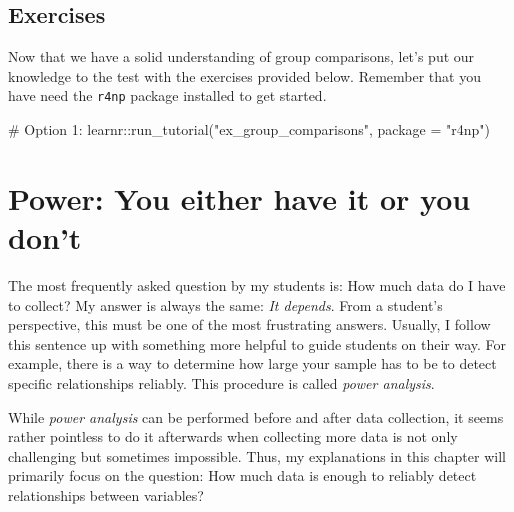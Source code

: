 \documentclass[
  letterpaper,
]{krantz}
\makeatletter
\newenvironment{Shaded}{\begin{snugshade}}{\end{snugshade}}
\newcommand{\AttributeTok}[1]{\textcolor[rgb]{0.40,0.45,0.13}{#1}}
\newcommand{\CommentTok}[1]{\textcolor[rgb]{0.37,0.37,0.37}{#1}}
\newcommand{\FunctionTok}[1]{\textcolor[rgb]{0.28,0.35,0.67}{#1}}
\newcommand{\NormalTok}[1]{\textcolor[rgb]{0.00,0.23,0.31}{#1}}
\newcommand{\SpecialCharTok}[1]{\textcolor[rgb]{0.37,0.37,0.37}{#1}}
\newcommand{\StringTok}[1]{\textcolor[rgb]{0.13,0.47,0.30}{#1}}
\newenvironment{kframe}{%
\medskip{}
\setlength{\fboxsep}{.8em}
 \def\at@end@of@kframe{}%
 \ifinner\ifhmode%
  \def\at@end@of@kframe{\end{minipage}}%
  \begin{minipage}{\columnwidth}%
 \fi\fi%
 \def\FrameCommand##1{\hskip\@totalleftmargin \hskip-\fboxsep
 \colorbox{shadecolor}{##1}\hskip-\fboxsep
     \hskip-\linewidth \hskip-\@totalleftmargin \hskip\columnwidth}%
 \MakeFramed {\advance\hsize-\width
   \@totalleftmargin\z@ \linewidth\hsize
   \@setminipage}}%
 {\par\unskip\endMakeFramed%
 \at@end@of@kframe}
\renewenvironment{Shaded}{\begin{kframe}}{\end{kframe}}
\makeatother
\begin{document}
\section{Exercises}\label{sec-exercises-group-comparisons}

Now that we have a solid understanding of group comparisons, let's put
our knowledge to the test with the exercises provided below. Remember
that you have need the \texttt{r4np} package installed to get started.

\begin{Shaded}
\begin{Highlighting}[]
\CommentTok{\# Option 1:}
\NormalTok{learnr}\SpecialCharTok{::}\FunctionTok{run\_tutorial}\NormalTok{(}\StringTok{"ex\_group\_comparisons"}\NormalTok{, }\AttributeTok{package =} \StringTok{"r4np"}\NormalTok{)}
\end{Highlighting}
\end{Shaded}


\chapter{Power: You either have it or you
don't}\label{sec-power-analysis}

The most frequently asked question by my students is: How much data do I
have to collect? My answer is always the same: \emph{It depends}. From a
student's perspective, this must be one of the most frustrating answers.
Usually, I follow this sentence up with something more helpful to guide
students on their way. For example, there is a way to determine how
large your sample has to be to detect specific relationships reliably.
This procedure is called \emph{power analysis}.

While \emph{power analysis} can be performed before and after data
collection, it seems rather pointless to do it afterwards when
collecting more data is not only challenging but sometimes impossible.
Thus, my explanations in this chapter will primarily focus on the
question: How much data is enough to reliably detect relationships
between variables?
\end{document}

